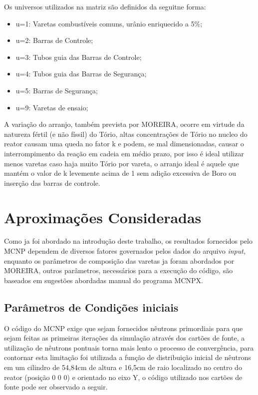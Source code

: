 \documentclass[
	12pt,				%
	openany,			%
	twoside,			%
	a4paper,			%
	english,			%
	french,				%
	spanish,			%
	brazil				%
	]{abntex2}
\begin{document}
Os universos utilizados na matriz são definidos da seguitne forma:
\begin{itemize}
\item u=1: Varetas combustíveis comuns, urânio enriquecido a 5\%;
\item u=2: Barras de Controle;
\item u=3: Tubos guia das Barras de Controle;
\item u=4: Tubos guia das Barras de Segurança;
\item u=5: Barras de Segurança;
\item u=9: Varetas de ensaio;
\end{itemize}
A variação do arranjo, também prevista por MOREIRA, ocorre em virtude
da natureza fértil (e não físsil) do Tório, altas concentrações de
Tório no nucleo do reator causam uma queda no fator k e podem, se
mal dimensionadas, causar o interrompimento da reação em cadeia em
médio prazo, por isso é ideal utilizar menos varetas caso haja muito
Tório por vareta, o arranjo ideal é aquele que mantém o valor de k
levemente acima de 1 sem adição excessiva de Boro ou inserção das
barras de controle.

\section{Aproximações Consideradas}

Como ja foi abordado na introdução deste trabalho, os resultados fornecidos pelo MCNP dependem de diversos fatores governados pelos dados do arquivo \textit{input, }enquanto os parâmetros de composição das varetas ja foram abordados por MOREIRA,  outros parâmetros, necessários para a execução do código, são baseados em sugestões abordadas manual do programa MCNPX.

\subsection{Parâmetros de Condições iniciais}

O código do MCNP exige que sejam fornecidos nêutrons primordiais para que sejam feitas as primeiras iterações da simulação através dos cartões de fonte, a utilização de nêutrons pontuais torna mais lento o processo de convergência, para contornar esta limitação foi utilizada a função de distribuição inicial de nêutrons em um cilindro de 54,84cm de altura e 16,5cm de raio localizado no centro do reator (posição 0 0 0) e orientado no eixo Y, o código utilizado nos cartões de fonte pode ser observado a seguir.
\end{document}
